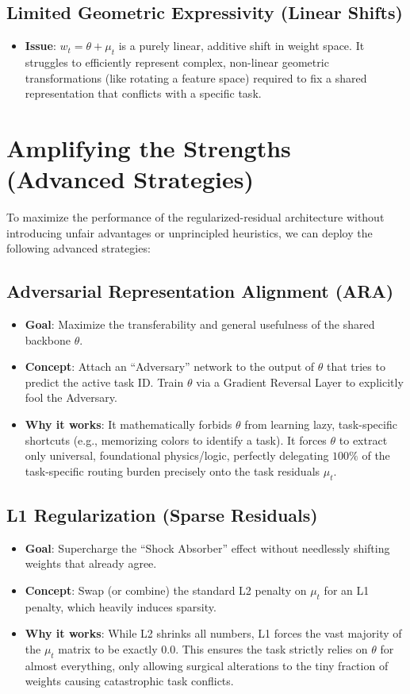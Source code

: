 \documentclass[11pt,a4paper]{article}
\begin{document}
\subsection{Limited Geometric Expressivity (Linear Shifts)}
\begin{itemize}
    \item \textbf{Issue}: $w_t = \theta + \mu_t$ is a purely linear, additive shift in weight space. It struggles to efficiently represent complex, non-linear geometric transformations (like rotating a feature space) required to fix a shared representation that conflicts with a specific task.
\end{itemize}

\section{Amplifying the Strengths (Advanced Strategies)}
To maximize the performance of the regularized-residual architecture without introducing unfair advantages or unprincipled heuristics, we can deploy the following advanced strategies:

\subsection{Adversarial Representation Alignment (ARA)}
\begin{itemize}
    \item \textbf{Goal}: Maximize the transferability and general usefulness of the shared backbone $\theta$.
    \item \textbf{Concept}: Attach an ``Adversary'' network to the output of $\theta$ that tries to predict the active task ID. Train $\theta$ via a Gradient Reversal Layer to explicitly fool the Adversary.
    \item \textbf{Why it works}: It mathematically forbids $\theta$ from learning lazy, task-specific shortcuts (e.g., memorizing colors to identify a task). It forces $\theta$ to extract only universal, foundational physics/logic, perfectly delegating $100\%$ of the task-specific routing burden precisely onto the task residuals $\mu_t$.
\end{itemize}

\subsection{L1 Regularization (Sparse Residuals)}
\begin{itemize}
    \item \textbf{Goal}: Supercharge the ``Shock Absorber'' effect without needlessly shifting weights that already agree.
    \item \textbf{Concept}: Swap (or combine) the standard L2 penalty on $\mu_t$ for an L1 penalty, which heavily induces sparsity.
    \item \textbf{Why it works}: While L2 shrinks all numbers, L1 forces the vast majority of the $\mu_t$ matrix to be exactly $0.0$. This ensures the task strictly relies on $\theta$ for almost everything, only allowing surgical alterations to the tiny fraction of weights causing catastrophic task conflicts.
\end{itemize}
\end{document}
